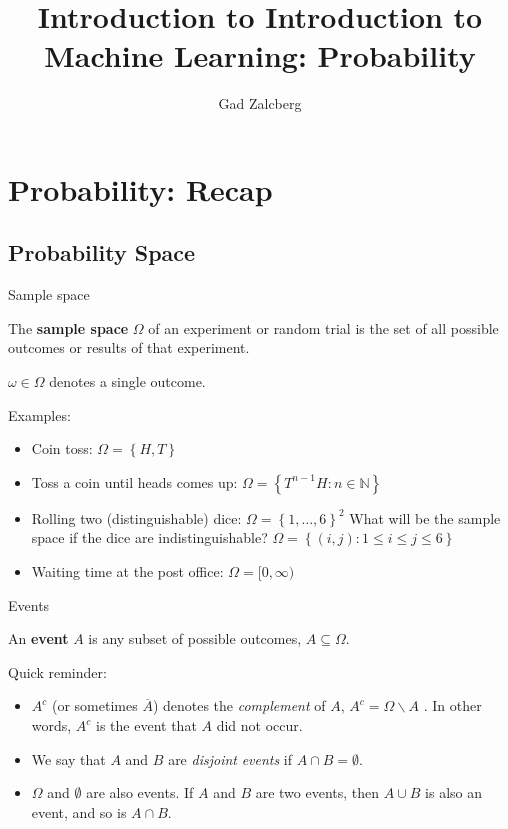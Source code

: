 \documentclass[11pt, usenames, dvipsnames]{beamer}
\title[Introduction to Machine Learning (67577)]{Introduction to Introduction to Machine Learning: Probability}
\author[Gad Zalcberg]{Gad Zalcberg}
\begin{document}
\titlepage 
\newcommand{\cD}{\mathcal{D}}
\newcommand{\bE}{\mathbb{E}}
\newcommand{\prob}{\mathbb{P}}


\section{Probability: Recap} 
\subsection{Probability Space}
\begin{frame}{Sample space}

    \begin{definition}
    The \textbf{sample space} $\Omega$ of an experiment or random trial is the set of all possible outcomes or results of that experiment.
    
    $\omega\in\Omega$ denotes a single outcome.
    \end{definition}
    
    \pause
    
    Examples:
    \begin{itemize}
    \item Coin toss: $\Omega=\left\{ H,T\right\} $

    \pause
    \item Toss a coin until heads comes up: $\Omega=\left\{ T^{n-1}H:n\in\mathbb{N}\right\} $
    
    \pause
    \item Rolling two (distinguishable) dice: $\Omega=\left\{ 1,\dots,6\right\} ^{2}$
    What will be the sample space if the dice are indistinguishable? $\Omega=\left\{ \left(i,j\right):1\le i\le j\le6\right\} $
    \pause
    \item Waiting time at the post office: $\Omega=[0,\infty)$
\end{itemize}
    
\end{frame}

\begin{frame}{Events}
\begin{definition}[Events]
An \textbf{event} $A$ is any subset of possible outcomes, $A\subseteq\Omega$.
\end{definition}
\pause
Quick reminder:
\begin{itemize}
\item $A^{c}$ (or sometimes $\overline{A}$) denotes the \textit{complement} of $A$, $A^{c}=\Omega\backslash A$ . In other words, $A^{c}$ is the event that $A$ did not occur. 
\pause
\item We say that $A$ and $B$ are \textit{disjoint} \textit{events} if $A\cap B=\emptyset$.
\pause
\item $\Omega$ and $\emptyset$ are also events. If $A$ and $B$ are two events, then $A\cup B$ is also an event, and so is $A\cap B$. 
\end{itemize}
\end{frame}
\end{document}
